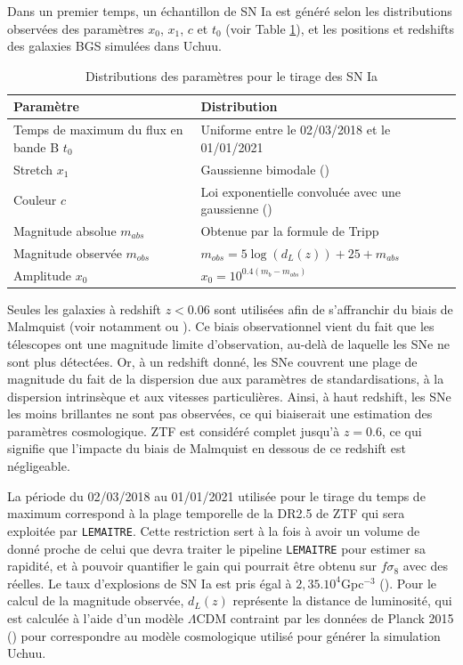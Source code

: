\documentclass{book}
\def\lemaitre{\texttt{LEMAITRE}\xspace}
\begin{document}
Dans un premier temps, un échantillon de SN Ia est généré selon les distributions observées des paramètres $x_0$, $x_1$, $c$ et $t_0$ (voir Table \ref{tab:snia}), et les positions et redshifts des galaxies BGS simulées dans Uchuu.

\begin{table}
    \centering
    \begin{tabular}{p{6.5cm}|p{7cm}}
         Paramètre & Distribution \\
         \hline
         Temps de maximum du flux en bande B $t_0$ & Uniforme entre le 02/03/2018 et le 01/01/2021\\
         Stretch $x_1$ & Gaussienne bimodale (\cite{nicolas_redshift_2021})\\
         Couleur $c$ &  Loi exponentielle convoluée avec une gaussienne (\cite{ginolin_ztf_2024}) \\
         Magnitude absolue $m_{abs}$ & Obtenue par la formule de Tripp\\
         Magnitude observée $m_{obs}$ & $m_{obs} = 5 \log(d_L(z)) + 25 + m_{abs}$\\
         Amplitude $x_0$ & $x_0 = 10^{0.4(m_b - m_{obs})}$
    \end{tabular}
    \caption{Distributions des paramètres pour le tirage des SN Ia}
    \label{tab:snia}
\end{table}

Seules les galaxies à redshift $z<0.06$ sont utilisées afin de s'affranchir du biais de Malmquist (voir notamment \cite{carreres_growth-rate_2023} ou \cite{boyd_accounting_2024}). Ce biais observationnel vient du fait que les télescopes ont une magnitude limite d'observation, au-delà de laquelle les SNe ne sont plus détectées. Or, à un redshift donné, les SNe couvrent une plage de magnitude du fait de la dispersion due aux paramètres de standardisations, à la dispersion intrinsèque et aux vitesses particulières. Ainsi, à haut redshift, les SNe les moins brillantes ne sont pas observées, ce qui biaiserait une estimation des paramètres cosmologique. ZTF est considéré complet jusqu'à $z=0.6$, ce qui signifie que l'impacte du biais de Malmquist en dessous de ce redshift est négligeable.

La période du 02/03/2018 au 01/01/2021 utilisée pour le tirage du temps de maximum correspond à la plage temporelle de la DR2.5 de ZTF qui sera exploitée par \lemaitre. Cette restriction sert à la fois à avoir un volume de donné proche de celui que devra traiter le pipeline \lemaitre pour estimer sa rapidité, et à pouvoir quantifier le gain qui pourrait être obtenu sur $f\sigma_8$ avec des réelles. Le taux d'explosions de SN Ia est pris égal à $2,35 .10^4$Gpc$^{-3}$ (\cite{perley_zwicky_2020}).
Pour le calcul de la magnitude observée, $d_L(z)$ représente la distance de luminosité, qui est calculée à l'aide d'un modèle $\Lambda$CDM contraint par les données de Planck 2015 (\cite{planck_collaboration_planck_2016}) pour correspondre au modèle cosmologique utilisé pour générer la simulation Uchuu.
\end{document}
